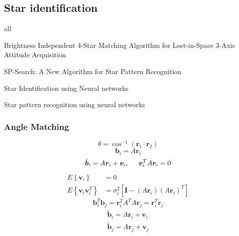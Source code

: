 \documentclass[12pt,a4paper,oneside]{article}
\begin{document}
\subsection{Star identification}
all \cite{spratling2009survey}\par
Brightness Independent 4-Star Matching Algorithm for Lost-in-Space 3-Axis Attitude Acquisition\cite{dong2006brightness} \par
SP-Search: A New Algorithm for Star Pattern Recognition \cite{mortari1999sp} \par
Star Identification using Neural networks \cite{miri2012star} \cite{lindbladstar} \par
Star pattern recognition using neural networks \cite{li2003star} \par


\subsubsection{Angle Matching}
\cite{gottlieb1978star}
\begin{equation}
\theta = \cos^{-1}(\bm{r}_1 \cdot \bm{r}_2)
\end{equation}
\begin{equation}
\bm{b}_i = A\bm{r}_i
\end{equation}
\begin{equation}
\tilde{\bm{b}}_i = A\bm{r}_i + \bm{v}_i, \hspace{0.5cm} \bm{v}_i^TA\bm{r}_i = 0
\end{equation}
\begin{subequations}
\begin{align*}
E\left\{\bm{v}_i\right\} &= 0 \\
E\left\{\bm{v}_i\bm{v}_i^T\right\} &= \sigma_i^2 [\bm{I} - (A\bm{r}_i)(A\bm{r}_i)^T]
\end{align*}
\end{subequations}
\begin{equation}
\bm{b}_i^T\bm{b}_j = \bm{r}_i^TA^TA\bm{r}_j = \bm{r}_i^T\bm{r}_j
\end{equation}
\begin{subequations}
\begin{align*}
\tilde{\bm{b}}_i = A\bm{r}_i + \bm{v}_i\\
\tilde{\bm{b}}_j = A\bm{r}_j + \bm{v}_j
\end{align*}
\end{subequations}
\end{document}
